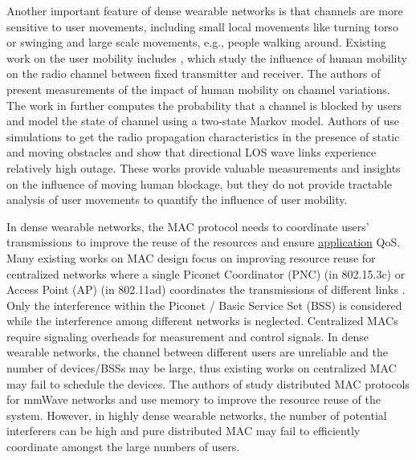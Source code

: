 \documentclass[10pt, conference, letterpaper]{IEEEtran}
\begin{document}
Another important feature of dense wearable networks is that channels are more sensitive to user movements, including small local movements like turning torso or swinging and large scale movements, e.g., people walking around. Existing work on the user mobility includes \cite{humanactivity}\cite{blockagein60ghz}\cite{timevaryingpathshadowing}, which study the influence of human mobility on the radio channel between fixed transmitter and receiver. The authors of \cite{humanactivity}\cite{timevaryingpathshadowing} present measurements of the impact of human mobility on channel variations. The work in \cite{timevaryingpathshadowing} further computes the probability that a channel is blocked by users and model the state of channel using a two-state Markov model. 
Authors of \cite{blockagein60ghz} use simulations to get the radio propagation characteristics in the presence of static and moving obstacles and show that directional LOS wave links experience relatively high outage. These works provide valuable measurements and insights on the influence of moving human blockage, but they do not provide tractable analysis of user movements to quantify the influence of user mobility.

In dense wearable networks, the MAC protocol needs to coordinate users' transmissions to improve the reuse of the resources and ensure \underline{application} QoS. Many existing works on MAC design focus on improving resource reuse for centralized networks where a single Piconet Coordinator (PNC) (in 802.15.3c) or Access Point (AP) (in 802.11ad) coordinates the transmissions of different links \cite{virtualtimeslot}\cite{rex}\cite{fdmac}. Only the interference within the Piconet / Basic Service Set (BSS) is considered while the interference among different networks is neglected. Centralized MACs require signaling overheads for measurement and control signals. In dense wearable networks, the channel between different users are unreliable and the number of devices/BSSs may be large, thus existing works on centralized MAC may fail to schedule the devices. The authors of \cite{dtdmac}\cite{mdmac} study distributed MAC protocols for mmWave networks and use memory to improve the resource reuse of the system. However, in highly dense wearable networks, the number of potential interferers can be high and pure distributed MAC may fail to efficiently coordinate amongst the large numbers of users. 
\end{document}

